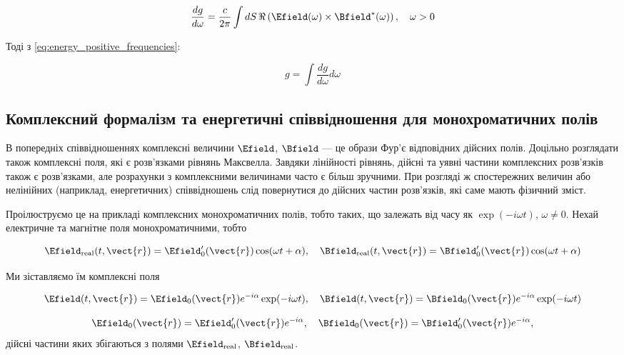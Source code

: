 \begin{equation}
\frac{dg}{d\omega} = \frac{c}{2\pi} \int dS \, \Re\left(\Efield(\omega) \times \Bfield^{*}(\omega)\right), \quad \omega > 0
\label{eq:energy_density}
\end{equation}

Тоді з \eqref{eq:energy_positive_frequencies}:

\begin{equation}
g = \int \frac{dg}{d\omega} d\omega
\label{eq:total_energy_integral}
\end{equation}

\subsection*{Комплексний формалізм та енергетичні співвідношення для монохроматичних полів}

В попередніх співвідношеннях комплексні величини \(\Efield\), \(\Bfield\) --- це образи Фур’є відповідних дійсних полів. Доцільно розглядати також
комплексні поля, які є розв’язками рівнянь Максвелла. Завдяки лінійності рівнянь, дійсні та уявні частини комплексних розв’язків також є розв’язками,
але розрахунки з комплексними величинами часто є більш зручними. При розгляді ж спостережних величин або нелінійних (наприклад, енергетичних)
співвідношень слід повернутися до дійсних частин розв’язків, які саме мають фізичний зміст.

Проілюструємо це на прикладі комплексних монохроматичних полів, тобто таких, що залежать від часу як \(\exp(-i\omega t)\), \(\omega \neq 0\). Нехай
електричне та магнітне поля монохроматичними, тобто

\begin{equation}
\Efield_{\text{real}}(t, \vect{r}) = \Efield'_0(\vect{r}) \cos(\omega t + \alpha), \quad \Bfield_{\text{real}}(t, \vect{r}) = \Bfield'_0(\vect{r})
\cos(\omega t + \alpha)
\label{eq:real_fields}
\end{equation}

Ми зіставляємо їм комплексні поля

\begin{equation}
\Efield(t, \vect{r}) = \Efield_0(\vect{r}) e^{-i\alpha} \exp(-i\omega t), \quad \Bfield(t, \vect{r}) = \Bfield_0(\vect{r}) e^{-i\alpha}
\exp(-i\omega t)
\label{eq:complex_fields}
\end{equation}

\begin{equation*}
\Efield_0(\vect{r}) = \Efield'_0(\vect{r}) e^{-i\alpha}, \quad \Bfield_0(\vect{r}) = \Bfield'_0(\vect{r}) e^{-i\alpha},
\end{equation*}
дійсні частини яких збігаються з полями \(\Efield_{\text{real}}\), \(\Bfield_{\text{real}}\).

